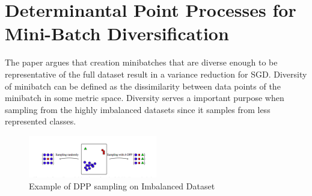 \documentclass[a4paper,twoside]{iiththesis}
\theoremstyle{definition}
\theoremstyle{definition}
\theoremstyle{remark}
\begin{document}
\section{Determinantal Point Processes for Mini-Batch Diversification\cite{zhangdiversified}}
The paper argues that creation minibatches that are diverse enough to be representative of the full dataset result in a variance reduction for SGD. Diversity of minibatch can be defined as the dissimilarity between data points of the minibatch in some metric space. Diversity serves a important purpose when sampling from the highly imbalanced datasets since it samples from less represented classes. \\
\begin{figure}[!htb] 
\centering
\includegraphics[width=0.5\textwidth] {images/diversity}
\caption{Example of DPP sampling on Imbalanced Dataset}
\label{Dpp_fig}
\end{figure}
\end{document}
